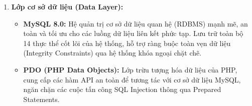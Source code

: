 \begin{enumerate}
    \item \textbf{Lớp cơ sở dữ liệu (Data Layer):}
    \begin{itemize}
        \item \textbf{MySQL 8.0:} Hệ quản trị cơ sở dữ liệu quan hệ (RDBMS) mạnh mẽ, an toàn và tối ưu cho các luồng dữ liệu liên kết phức tạp. Lưu trữ toàn bộ 14 thực thể cốt lõi của hệ thống, hỗ trợ ràng buộc toàn vẹn dữ liệu (Integrity Constraints) qua hệ thống khóa ngoại chặt chẽ.
        \item \textbf{PDO (PHP Data Objects):} Lớp trừu tượng hóa dữ liệu của PHP, cung cấp các hàm API an toàn để tương tác với cơ sở dữ liệu MySQL, ngăn chặn các cuộc tấn công SQL Injection thông qua Prepared Statements.
    \end{itemize}
\end{enumerate}
